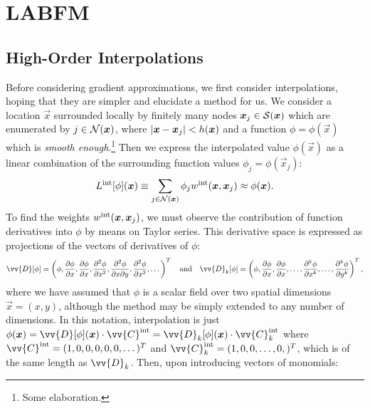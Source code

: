 

\section{LABFM}

\cite{king2024MeshFreeFrameworkHighOrder, king2020HighOrderDifference, king2024MeshfreeFrameworkHighorder, king2022HighorderSimulationsIsothermal, king2024SunsetFlamesDNSCode}


\subsection{High-Order Interpolations}


Before considering gradient approximations, we first consider interpolations, hoping that they are simpler and elucidate a method for us. We consider a location $\vec{x}$ surrounded locally by finitely many nodes $\vec{x}_j \in \cl{S}(\vec{x})$ which are enumerated by $j \in \cl{N}(\vec{x})$, where $\abs{\vec{x} - \vec{x}_j} < h(\vec{x})$ and a function $\phi = \phi(\vec{x})$ which is \emph{smooth enough}.\footnote{Some elaboration.} Then we express the interpolated value $\phi(\vec{x})$ as a linear combination of the surrounding function values $\phi_j = \phi(\vec{x}_j)$:
\begin{equation} \label{eqn:L}
L^{\rm{int}}[\phi](\vec{x}) \equiv \sum_{j \in \cl{N}(\vec{x})} \phi_j w^{\rm{int}}(\vec{x}, \vec{x}_j) \approx \phi(\vec{x}).
\end{equation}
To find the weights $w^{\rm{int}}(\vec{x}, \vec{x}_j)$, we must observe the contribution of function derivatives into $\phi$ by means on Taylor series. This derivative space is expressed as projections of the vectors of derivatives of $\phi$:
\begin{equation}
\vv{D}[\phi] = \left(\phi, \pdv{\phi}{x}, \pdv{\phi}{x}, \pdv[2]{\phi}{x}, \pdv[2]{\phi}{x}{y}, \pdv[2]{\phi}{x}, \dots \right)^T
\quad \text{and} \quad
\vv{D}_k[\phi] = \left(\phi, \pdv{\phi}{x}, \pdv{\phi}{x}, \dots, \pdv[k]{\phi}{x}, \dots, \pdv[k]{\phi}{y} \right)^T,
\end{equation}
where we have assumed that $\phi$ is a scalar field over two spatial dimensions $\vec{x}=(x, y)$, although the method may be simply extended to any number of dimensions. In this notation, interpolation is just $\phi(\vec{x}) = \vv{D}[\phi](\vec{x}) \cdot \vv{C}^{\rm{int}} = \vv{D}_k[\phi](\vec{x}) \cdot \vv{C}_k^{\rm{int}}$ where $\vv{C}^{\rm{int}} = (1, 0, 0, 0, 0, 0, \dots)^T$ and $\vv{C}_k^{\rm{int}} = (1, 0, 0, \dots, 0,)^T$, which is of the same length as $\vv{D}_k$. Then, upon introducing vectors of monomials:

